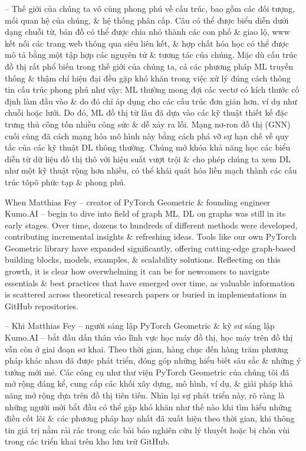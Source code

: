 \documentclass{article}
\begin{document}
\begin{itemize}
    -- Thế giới của chúng ta vô cùng phong phú về cấu trúc, bao gồm các đối tượng, mối quan hệ của chúng, \& hệ thống phân cấp. Câu có thể được biểu diễn dưới dạng chuỗi từ, bản đồ có thể được chia nhỏ thành các con phố \& giao lộ, www kết nối các trang web thông qua siêu liên kết, \& hợp chất hóa học có thể được mô tả bằng một tập hợp các nguyên tử \& tương tác của chúng. Mặc dù cấu trúc đồ thị rất phổ biến trong thế giới của chúng ta, cả các phương pháp ML truyền thống \& thậm chí hiện đại đều gặp khó khăn trong việc xử lý đúng cách thông tin cấu trúc phong phú như vậy: ML thường mong đợi các vectơ có kích thước cố định làm đầu vào \& do đó chỉ áp dụng cho các cấu trúc đơn giản hơn, ví dụ như chuỗi hoặc lưới. Do đó, ML đồ thị từ lâu đã dựa vào các kỹ thuật thiết kế đặc trưng thủ công tốn nhiều công sức \& dễ xảy ra lỗi. Mạng nơ-ron đồ thị (GNN) cuối cùng đã cách mạng hóa mô hình này bằng cách phá vỡ sự hạn chế về quy tắc của các kỹ thuật DL thông thường. Chúng mở khóa khả năng học các biểu diễn từ dữ liệu đồ thị thô với hiệu suất vượt trội \& cho phép chúng ta xem DL như một kỹ thuật rộng hơn nhiều, có thể khái quát hóa liền mạch thành các cấu trúc tôpô phức tạp \& phong phú.

    When {\sc Matthias Fey} -- creator of PyTorch Geometric \& founding engineer Kumo.AI -- begin to dive into field of graph ML, DL on graphs was still in its early stages. Over time, dozens to hundreds of different methods were developed, contributing incremental insights \& refreshing ideas. Tools like our own PyTorch Geometric library have expanded significantly, offering cutting-edge graph-based building blocks, models, examples, \& scalability solutions. Reflecting on this growth, it is clear how overwhelming it can be for newcomers to navigate essentials \& best practices that have emerged over time, as valuable information is scattered across theoretical research papers or buried in implementations in GitHub repositories.

    -- Khi {\sc Matthias Fey} -- người sáng lập PyTorch Geometric \& kỹ sư sáng lập Kumo.AI -- bắt đầu dấn thân vào lĩnh vực học máy đồ thị, học máy trên đồ thị vẫn còn ở giai đoạn sơ khai. Theo thời gian, hàng chục đến hàng trăm phương pháp khác nhau đã được phát triển, đóng góp những hiểu biết sâu sắc \& những ý tưởng mới mẻ. Các công cụ như thư viện PyTorch Geometric của chúng tôi đã mở rộng đáng kể, cung cấp các khối xây dựng, mô hình, ví dụ, \& giải pháp khả năng mở rộng dựa trên đồ thị tiên tiến. Nhìn lại sự phát triển này, rõ ràng là những người mới bắt đầu có thể gặp khó khăn như thế nào khi tìm hiểu những điều cốt lõi \& các phương pháp hay nhất đã xuất hiện theo thời gian, khi thông tin giá trị nằm rải rác trong các bài báo nghiên cứu lý thuyết hoặc bị chôn vùi trong các triển khai trên kho lưu trữ GitHub.


\end{itemize}
\end{document}
